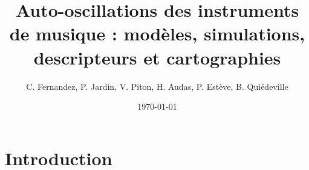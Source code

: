 \documentclass[atiam, article]{rapport} %
\title{Auto-oscillations des instruments de musique : modèles, simulations, descripteurs et cartographies}
\author{C. Fernandez, P. Jardin, V. Piton, H. Audas, P. Estève, B. Quiédeville} %
\date{\today}
\begin{document}
\maketitle

\section{Introduction}

\end{document}
